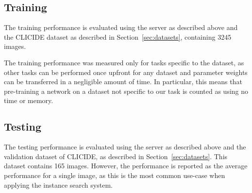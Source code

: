 \subsection{Training}
The training performance is evaluated using the server as described above
and the CLICIDE dataset as described in Section~\ref{sec:datasets},
containing 3245 images.

The training performance was measured only for tasks specific to the dataset,
as other tasks can be performed once upfront for any dataset and parameter
weights can be transferred in a negligible amount of time.
In particular, this means
that pre-training a network on a dataset not specific to our task is
counted as using no time or memory.

\subsection{Testing}
The testing performance is evaluated using the server as described above and
the validation dataset of CLICIDE, as described in Section~\ref{sec:datasets}.
This dataset contains 165 images. However, the performance is reported
as the average performance for a single image, as this is the most common
use-case when applying the instance search system.
